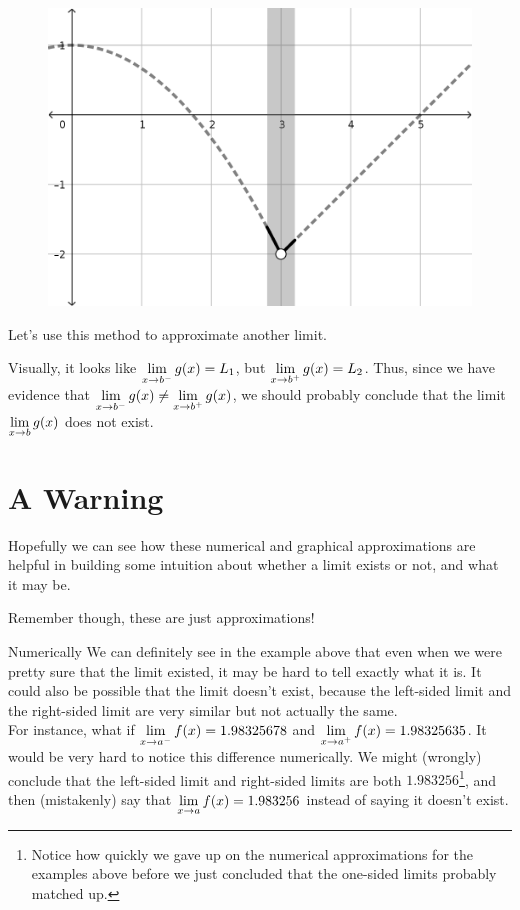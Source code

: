 \begin{figure}[h!tb]
  \includegraphics[scale=0.75]{./1_limits/images/1-1_graph1bar2.png}
  \centering
\end{figure}

Let's use this method to approximate another limit.



Visually, it looks like $\displaystyle \lim_{x\to b^-} g(x) = L_1$, but $\displaystyle \lim_{x\to b^+} g(x) = L_2$. Thus, since we have evidence that $\displaystyle \lim_{x\to b^-} g(x) \neq \displaystyle \lim_{x\to b^+} g(x)$, we should probably conclude that the limit $\displaystyle \lim_{x\to b} g(x)$ does not exist.

\section*{A Warning}

Hopefully we can see how these numerical and graphical approximations are helpful in building some intuition about whether a limit exists or not, and what it may be.

Remember though, these are just approximations!
\begin{defn}{Numerically}
  We can definitely see in the example above that even when we were pretty sure that the limit existed, it may be hard to tell exactly what it is.
  It could also be possible that the limit doesn't exist, because the left-sided limit and the right-sided limit are very similar but not actually the same.\\

  For instance, what if $\displaystyle \lim_{x\to a^-} f(x) = 1.98325678$ and $\displaystyle \lim_{x\to a^+} f(x) = 1.98325635$.
  It would be very hard to notice this difference numerically.
  We might (wrongly) conclude that the left-sided limit and right-sided limits are both $1.983256$\footnote{Notice how quickly we gave up on the numerical approximations for the examples above before we just concluded that the one-sided limits probably matched up.}, and then (mistakenly) say that $\displaystyle \lim_{x\to a} f(x)=1.983256$ instead of saying it doesn't exist.
\end{defn}

